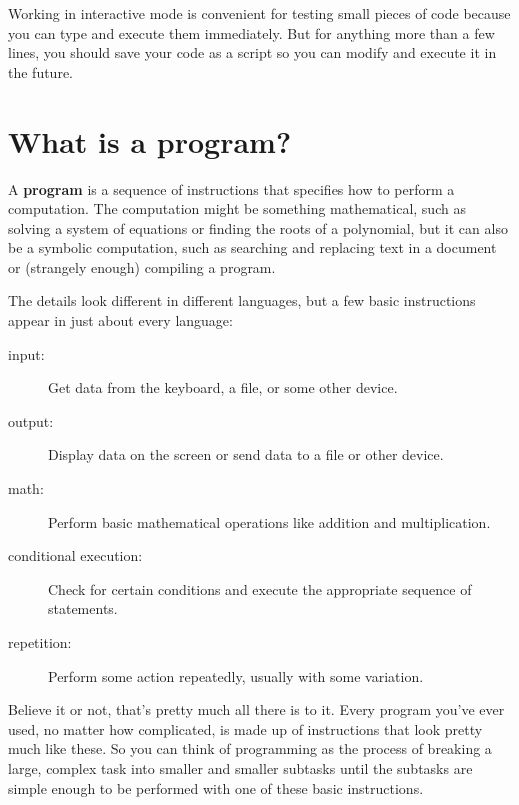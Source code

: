 \documentclass[10pt]{book}
\begin{document}

Working in interactive mode is convenient for testing small pieces of
code because you can type and execute them immediately.  But for
anything more than a few lines, you should save your code
as a script so you can modify and execute it in the future.


\section{What is a program?}

A {\bf program} is a sequence of instructions that specifies how to
perform a computation.  The computation might be something
mathematical, such as solving a system of equations or finding the
roots of a polynomial, but it can also be a symbolic computation, such
as searching and replacing text in a document or (strangely enough)
compiling a program.


The details look different in different languages, but a few basic
instructions appear in just about every language:

\begin{description}

\item[input:] Get data from the keyboard, a file, or some
other device.

\item[output:] Display data on the screen or send data to a
file or other device.

\item[math:] Perform basic mathematical operations like addition and
multiplication.

\item[conditional execution:] Check for certain conditions and
execute the appropriate sequence of statements.

\item[repetition:] Perform some action repeatedly, usually with
some variation.

\end{description}

Believe it or not, that's pretty much all there is to it.  Every
program you've ever used, no matter how complicated, is made up of
instructions that look pretty much like these.  So you can think of
programming as the process of breaking a large, complex task
into smaller and smaller subtasks until the subtasks are
simple enough to be performed with one of these basic instructions.
\end{document}
